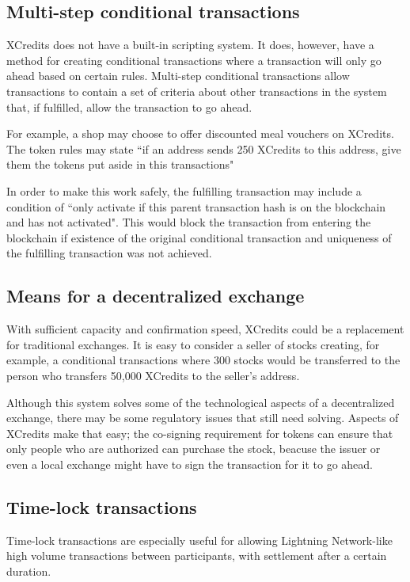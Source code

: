 \documentclass[a4paper,12pt]{article}
\begin{document}
\subsection{Multi-step conditional transactions}
XCredits does not have a built-in scripting system. It does, however, have a method for creating conditional transactions where a transaction will only go ahead based on certain rules. Multi-step conditional transactions allow transactions to contain a set of criteria about other transactions in the system that, if fulfilled, allow the transaction to go ahead.

For example, a shop may choose to offer discounted meal vouchers on XCredits. The token rules may state ``if an address sends 250 XCredits to this address, give them the tokens put aside in this transactions"

In order to make this work safely, the fulfilling transaction may include a condition of ``only activate if this parent transaction hash is on the blockchain and has not activated". This would block the transaction from entering the blockchain if existence of the original conditional transaction and uniqueness of the fulfilling transaction was not achieved. 


\subsection{Means for a decentralized exchange}
With sufficient capacity and confirmation speed, XCredits could be a replacement for traditional exchanges. It is easy to consider a seller of stocks creating, for example, a conditional transactions where 300 stocks would be transferred to the person who transfers 50,000 XCredits to the seller's address. 

Although this system solves some of the technological aspects of a decentralized exchange, there may be some regulatory issues that still need solving. Aspects of XCredits make that easy; the co-signing requirement for tokens can ensure that only people who are authorized can purchase the stock, beacuse the issuer or even a local exchange might have to sign the transaction for it to go ahead. 


\subsection{Time-lock transactions}
Time-lock transactions are especially useful for allowing Lightning Network-like high volume transactions between participants, with settlement after a certain duration. 
\end{document}
